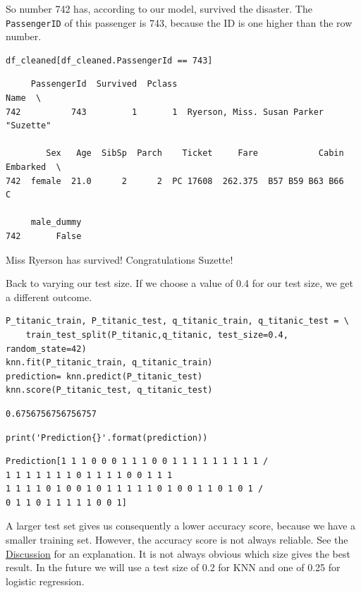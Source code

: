 \documentclass[11pt]{article}
\begin{document}
So number 742 has, according to our model, survived the disaster. The \texttt{PassengerID} of this passenger is 743, because the ID is one higher than the row number. 

\begin{verbatim}
df_cleaned[df_cleaned.PassengerId == 743]
\end{verbatim}

\begin{verbatim}
     PassengerId  Survived  Pclass                                   Name  \
742          743         1       1  Ryerson, Miss. Susan Parker "Suzette"   

        Sex   Age  SibSp  Parch    Ticket     Fare            Cabin Embarked  \
742  female  21.0      2      2  PC 17608  262.375  B57 B59 B63 B66        C   

     male_dummy  
742       False  
\end{verbatim}

Miss Ryerson has survived! Congratulations Suzette!


Back to varying our test size. If we choose a value of 0.4 for our test size, we get a different outcome.

\begin{verbatim}
P_titanic_train, P_titanic_test, q_titanic_train, q_titanic_test = \
    train_test_split(P_titanic,q_titanic, test_size=0.4, random_state=42)
knn.fit(P_titanic_train, q_titanic_train)
prediction= knn.predict(P_titanic_test)
knn.score(P_titanic_test, q_titanic_test)

\end{verbatim}

\begin{verbatim}
0.6756756756756757
\end{verbatim}

\begin{verbatim}
print('Prediction{}'.format(prediction))
\end{verbatim}

\begin{verbatim}
Prediction[1 1 1 0 0 0 1 1 1 0 0 1 1 1 1 1 1 1 1 1 /
1 1 1 1 1 1 1 0 1 1 1 1 0 0 1 1 1
1 1 1 1 0 1 0 0 1 0 1 1 1 1 1 0 1 0 0 1 1 0 1 0 1 /
0 1 1 0 1 1 1 1 1 0 0 1]

\end{verbatim}


A larger test set gives us consequently a lower accuracy score, because we have a smaller training set. However, the accuracy score is not always reliable. See the \hyperref[sec:discussion]{Discussion} for an explanation. It is not always obvious which size gives the best result. In the future we will use a test size of 0.2 for KNN and one of 0.25 for logistic regression. 
\end{document}
